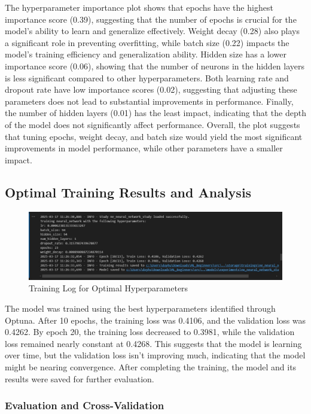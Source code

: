 The hyperparameter importance plot shows that epochs have the highest importance score (0.39), suggesting that the number of epochs is crucial for the model’s ability to learn and generalize effectively. Weight decay (0.28) also plays a significant role in preventing overfitting, while batch size (0.22) impacts the model’s training efficiency and generalization ability. Hidden size has a lower importance score (0.06), showing that the number of neurons in the hidden layers is less significant compared to other hyperparameters. Both learning rate and dropout rate have low importance scores (0.02), suggesting that adjusting these parameters does not lead to substantial improvements in performance. Finally, the number of hidden layers (0.01) has the least impact, indicating that the depth of the model does not significantly affect performance. Overall, the plot suggests that tuning epochs, weight decay, and batch size would yield the most significant improvements in model performance, while other parameters have a smaller impact.

\subsection{Optimal Training Results and Analysis}

\begin{figure}[hbt!]
    \centering
    \includegraphics[width=1\linewidth]{Images/5.7.a.jpg}
    \caption{Training Log for Optimal Hyperparameters}
    \label{fig:enter-label}
\end{figure}

The model was trained using the best hyperparameters identified through Optuna. After 10 epochs, the training loss was 0.4106, and the validation loss was 0.4262. By epoch 20, the training loss decreased to 0.3981, while the validation loss remained nearly constant at 0.4268. This suggests that the model is learning over time, but the validation loss isn't improving much, indicating that the model might be nearing convergence. After completing the training, the model and its results were saved for further evaluation.

\subsubsection{Evaluation and Cross-Validation}

